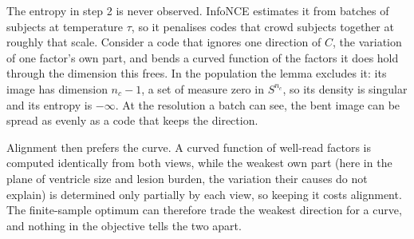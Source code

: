 The entropy in step 2 is never observed. InfoNCE estimates it from batches of
subjects at temperature $\tau$, so it penalises codes that crowd subjects
together at roughly that scale. Consider a code that ignores one direction of
$C$, the variation of one factor's own part, and bends a curved function of the
factors it does hold through the dimension this frees. In the population the
lemma excludes it: its image has dimension $n_c - 1$, a set of measure zero in
$S^{n_c}$, so its density is singular and its entropy is $-\infty$. At the
resolution a batch can see, the bent image can be spread as evenly as a code
that keeps the direction.

Alignment then prefers the curve. A curved function of well-read factors is
computed identically from both views, while the weakest own part (here in the
plane of ventricle size and lesion burden, the variation their causes do not
explain) is determined only partially by each view, so keeping it costs
alignment. The finite-sample optimum can therefore trade the weakest direction
for a curve, and nothing in the objective tells the two apart.

